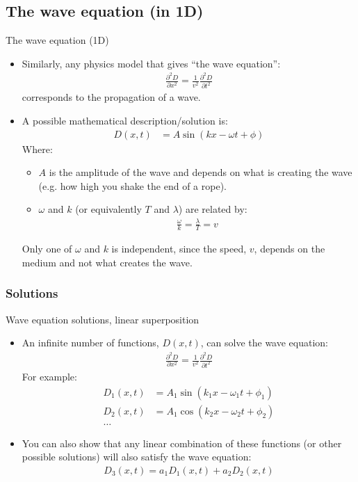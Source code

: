 \documentclass[aspectratio=169,
hyperref={colorlinks,urlcolor=blue}
]{beamer}
\begin{document}
\subsection{The wave equation (in 1D)}
\label{subsec:thewaveequationin1d}
\begin{frame}{The wave equation (1D)}
\begin{itemize}
\item Similarly, any physics model that gives ``the wave equation'':
\begin{align*}
\frac{\partial^2D}{\partial x^2}=\frac{1}{v^2}\frac{\partial^2D}{\partial t^2}
\end{align*}
corresponds to the propagation of a wave.
\item A possible mathematical description/solution is:
\begin{align*}
D(x,t) &=A\sin\left (kx-\omega t +\phi\right)
\end{align*}
Where:
\begin{itemize}
\item $A$ is the amplitude of the wave and depends on what is creating the wave (e.g. how high you shake the end of a rope).
\item $\omega$ and $k$ (or equivalently $T$ and $\lambda$) are related by:
\begin{align*}
\frac{\omega}{k}=\frac{\lambda}{T}=v
\end{align*}
\end{itemize}
Only one of $\omega$ and $k$ is independent, since the speed, $v$, depends on the medium and not what creates the wave. 
\end{itemize}
\end{frame}





\subsubsection{Solutions}
\label{subsubsec:solutions}
\begin{frame}{Wave equation solutions, linear superposition}
\begin{itemize}
\item An infinite number of functions, $D(x,t)$, can solve the wave equation:
\begin{align*}
\frac{\partial^2D}{\partial x^2}=\frac{1}{v^2}\frac{\partial^2D}{\partial t^2}
\end{align*}
For example:
\begin{align*}
D_1(x,t) &=A_1\sin\left (k_1x-\omega_1 t +\phi_1\right)\\
D_2(x,t) &=A_1\cos\left (k_2x-\omega_2 t +\phi_2\right)\\
\dots&
\end{align*}
\item You can also show that any linear combination of these functions (or other possible solutions) will also satisfy the wave equation:
\begin{align*}
D_3(x,t)=a_1D_1(x,t)+a_2D_2(x,t)
\end{align*}
\end{itemize}
\end{frame}
\end{document}
